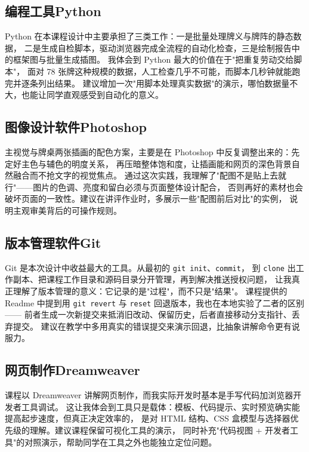 \documentclass[supercite]{Experimental_Report}
\begin{document}
\subsection{编程工具Python}

Python 在本课程设计中主要承担了三类工作：一是批量处理牌义与牌阵的静态数据，
二是生成自检脚本，驱动浏览器完成全流程的自动化检查，三是绘制报告中的框架图与批量生成插图。
我体会到 Python 最大的价值在于"把重复劳动交给脚本"，
面对 78 张牌这种规模的数据，人工检查几乎不可能，而脚本几秒钟就能跑完并逐条列出结果。
建议增加一次"用脚本处理真实数据"的演示，哪怕数据量不大，也能让同学直观感受到自动化的意义。

\subsection{图像设计软件Photoshop}

主视觉与牌桌两张插画的配色方案，主要是在 Photoshop 中反复调整出来的：先定好主色与辅色的明度关系，
再压暗整体饱和度，让插画能和网页的深色背景自然融合而不抢文字的视觉焦点。
通过这次实践，我理解了"配图不是贴上去就行"——图片的色调、亮度和留白必须与页面整体设计配合，
否则再好的素材也会破坏页面的一致性。建议在讲评作业时，多展示一些"配图前后对比"的实例，
说明主观审美背后的可操作规则。

\subsection{版本管理软件Git}

Git 是本次设计中收益最大的工具。从最初的 \texttt{git init}、\texttt{commit}，
到 \texttt{clone} 出工作副本、把课程工作目录和源码目录分开管理，再到解决推送授权问题，
让我真正理解了版本管理的意义：它记录的是"过程"，而不只是"结果"。
课程提供的 Readme 中提到用 \texttt{git revert} 与 \texttt{reset} 回退版本，我也在本地实验了二者的区别——
前者生成一次新提交来抵消旧改动、保留历史，后者直接移动分支指针、丢弃提交。
建议在教学中多用真实的错误提交来演示回退，比抽象讲解命令更有说服力。

\subsection{网页制作Dreamweaver}

课程以 Dreamweaver 讲解网页制作，而我实际开发时基本是手写代码加浏览器开发者工具调试。
这让我体会到工具只是载体：模板、代码提示、实时预览确实能提高起步速度，但真正决定效率的，
是对 HTML 结构、CSS 盒模型与选择器优先级的理解。建议课程保留可视化工具的演示，
同时补充"代码视图 + 开发者工具"的对照演示，帮助同学在工具之外也能独立定位问题。

\clearpage

\nocite{*} %

%
%
\end{document}
